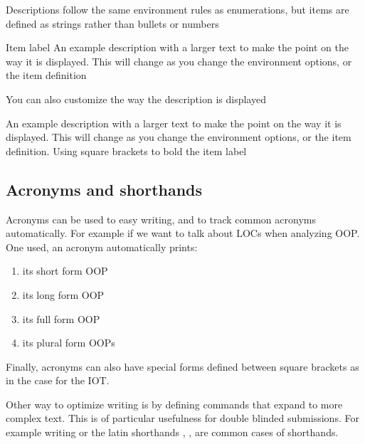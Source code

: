 Descriptions follow the same environment rules as enumerations, but items are defined as strings rather than bullets or numbers

\begin{description}
  \item{Item label} An example description with a larger text to make the point on the way it is displayed. This will change as you change the environment options, or the item definition
\end{description}

You can also customize the way the description is displayed
\begin{description}[labelindent=1cm]
  \item[Item label] An example description with a larger text to make the point on the way it is displayed. This will change as you change the environment options, or the item definition. Using square brackets to bold the item label 
\end{description}


\subsection{Acronyms and shorthands}
\label{sec:acrosnyms}

Acronyms can be used to easy writing, and to track common acronyms automatically. For example if we want to talk about \acp{LOC} when analyzing \ac{OOP}. One used, an acronym automatically prints:
\begin{enumerate}
  \item its short form \ac{OOP}
  \item its long form \acl{OOP}
  \item its full form \acf{OOP}
  \item its plural form \acp{OOP}
\end{enumerate}

Finally, acronyms can also have special forms defined between square brackets as in the case for the \ac{IOT}. 

Other way to optimize writing is by defining commands that expand to more complex text. This is of particular usefulness for double blinded submissions. For example writing \js or the latin shorthands \ie, \eg, \cf are common cases of shorthands.



\endinput